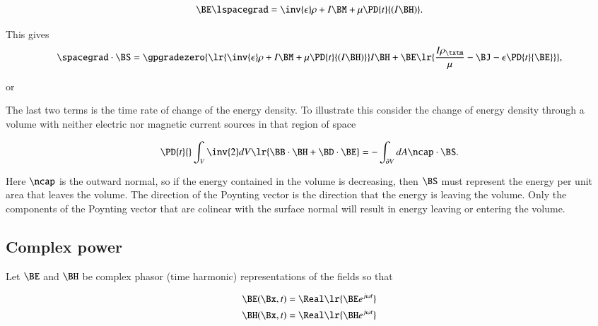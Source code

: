 \begin{dmath}\label{eqn:maxwellsEquations:660}
\BE \lspacegrad = \inv{\epsilon} \rho + I \BM + \mu \PD{t}{(I\BH)}.
\end{dmath}

This gives
\begin{dmath}\label{eqn:maxwellsEquations:680}
\spacegrad \cdot \BS
=
\gpgradezero
{
\lr{ \inv{\epsilon} \rho + I \BM + \mu \PD{t}{(I\BH)} } I \BH
+
\BE
\lr
{
\frac{I \rho_\txtm}{\mu} - \BJ - \epsilon \PD{t}{\BE}
}
}
,
\end{dmath}

or

The last two terms is the time rate of change of the energy density.  To illustrate this consider the change of energy density through a volume with neither electric nor magnetic current sources in that region of space

\begin{dmath}\label{eqn:maxwellsEquations:740}
\PD{t}{} \int_V
\inv{2} dV \lr{
\BB \cdot \BH
+ \BD \cdot \BE
}
=
-\int_{\partial V} dA \ncap \cdot \BS.
\end{dmath}

Here \( \ncap \) is the outward normal, so if the energy contained in the volume is decreasing, then \( \BS \) must represent the energy per unit area that leaves the volume.  The direction of the Poynting vector is the direction that the energy is leaving the volume.  Only the components of the Poynting vector that are colinear with the surface normal will result in energy leaving or entering the volume.

\subsection{Complex power}

Let \( \BE \) and \( \BH \) be complex phasor (time harmonic) representations of the fields so that

\begin{dmath}\label{eqn:maxwellsEquations:n}
\begin{aligned}
\BE(\Bx, t) &= \Real\lr{ \BE e^{j \omega t} } \\
\BH(\Bx, t) &= \Real\lr{ \BH e^{j \omega t} }
\end{aligned}
\end{dmath}

